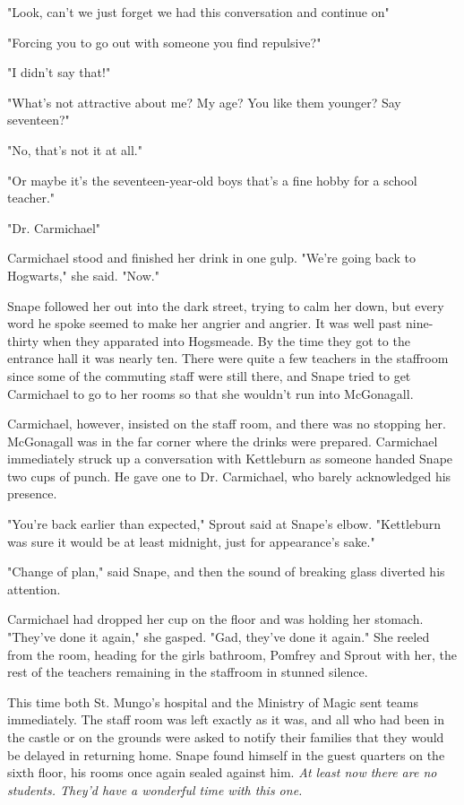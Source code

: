 "Look, can't we just forget we had this conversation and continue on{\el}"

"Forcing you to go out with someone you find repulsive?"

"I didn't say that!"

"What's not attractive about me? My age? You like them younger? Say seventeen?"

"No, that's not it at all."

"Or maybe it's the seventeen-year-old boys{\el} that's a fine hobby for a school teacher."

"Dr. Carmichael{\el}"

Carmichael stood and finished her drink in one gulp. "We're going back to Hogwarts," she said. "Now."

Snape followed her out into the dark street, trying to calm her down, but every word he spoke seemed to make her angrier and angrier. It was well past nine-thirty when they apparated into Hogsmeade. By the time they got to the entrance hall it was nearly ten. There were quite a few teachers in the staffroom since some of the commuting staff were still there, and Snape tried to get Carmichael to go to her rooms so that she wouldn't run into McGonagall.

Carmichael, however, insisted on the staff room, and there was no stopping her. McGonagall was in the far corner where the drinks were prepared. Carmichael immediately struck up a conversation with Kettleburn as someone handed Snape two cups of punch. He gave one to Dr. Carmichael, who barely acknowledged his presence.

"You're back earlier than expected," Sprout said at Snape's elbow. "Kettleburn was sure it would be at least midnight, just for appearance's sake."

"Change of plan," said Snape, and then the sound of breaking glass diverted his attention.

Carmichael had dropped her cup on the floor and was holding her stomach. "They've done it again," she gasped. "Gad, they've done it again." She reeled from the room, heading for the girls bathroom, Pomfrey and Sprout with her, the rest of the teachers remaining in the staffroom in stunned silence.

This time both St. Mungo's hospital and the Ministry of Magic sent teams immediately. The staff room was left exactly as it was, and all who had been in the castle or on the grounds were asked to notify their families that they would be delayed in returning home. Snape found himself in the guest quarters on the sixth floor, his rooms once again sealed against him. \emph{At least now there are no students. They'd have a wonderful time with this one.}

